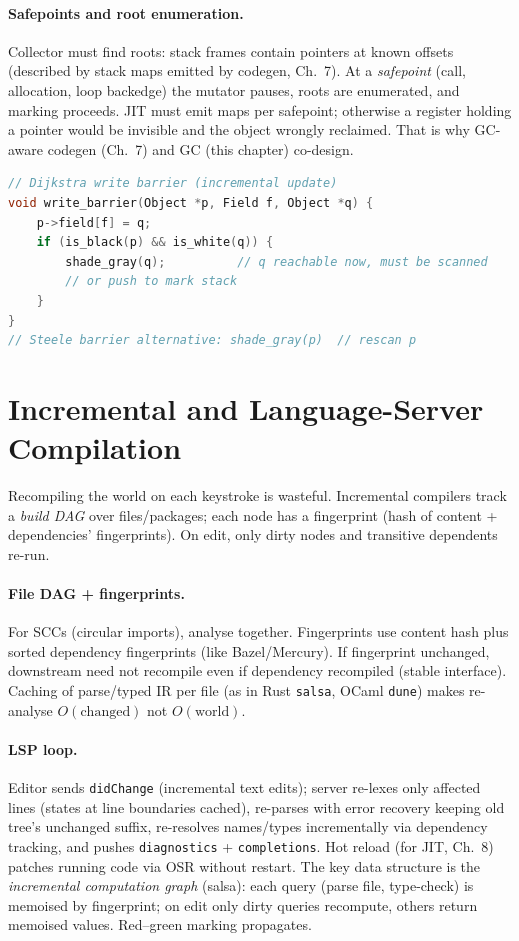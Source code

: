 \paragraph{Safepoints and root enumeration.}
Collector must find roots: stack frames contain pointers at known offsets (described by stack maps emitted by codegen, Ch.~7). At a \emph{safepoint} (call, allocation, loop backedge) the mutator pauses, roots are enumerated, and marking proceeds. JIT must emit maps per safepoint; otherwise a register holding a pointer would be invisible and the object wrongly reclaimed. That is why GC-aware codegen (Ch.~7) and GC (this chapter) co-design.

\begin{lstlisting}[language=C]
// Dijkstra write barrier (incremental update)
void write_barrier(Object *p, Field f, Object *q) {
    p->field[f] = q;
    if (is_black(p) && is_white(q)) {
        shade_gray(q);          // q reachable now, must be scanned
        // or push to mark stack
    }
}
// Steele barrier alternative: shade_gray(p)  // rescan p
\end{lstlisting}

\section{Incremental and Language-Server Compilation}
\label{sec:incremental}
Recompiling the world on each keystroke is wasteful. Incremental compilers track a \emph{build DAG} over files/packages; each node has a fingerprint (hash of content + dependencies' fingerprints). On edit, only dirty nodes and transitive dependents re-run.

\paragraph{File DAG + fingerprints.}
For SCCs (circular imports), analyse together. Fingerprints use content hash plus sorted dependency fingerprints (like Bazel/Mercury). If fingerprint unchanged, downstream need not recompile even if dependency recompiled (stable interface). Caching of parse/typed IR per file (as in Rust \texttt{salsa}, OCaml \texttt{dune}) makes re-analyse $O(\text{changed})$ not $O(\text{world})$.

\paragraph{LSP loop.} Editor sends \texttt{didChange} (incremental text edits); server re-lexes only affected lines (states at line boundaries cached), re-parses with error recovery keeping old tree's unchanged suffix, re-resolves names/types incrementally via dependency tracking, and pushes \texttt{diagnostics} + \texttt{completions}. Hot reload (for JIT, Ch.~8) patches running code via OSR without restart. The key data structure is the \emph{incremental computation graph} (salsa): each query (parse file, type-check) is memoised by fingerprint; on edit only dirty queries recompute, others return memoised values. Red--green marking propagates.

